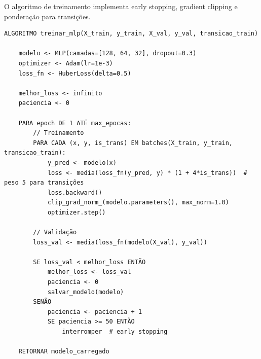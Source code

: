 O algoritmo de treinamento implementa early stopping, gradient clipping e ponderação para transições.

\begin{Verbatim}[breaklines=true, frame=single]
ALGORITMO treinar_mlp(X_train, y_train, X_val, y_val, transicao_train)
    
    modelo <- MLP(camadas=[128, 64, 32], dropout=0.3)
    optimizer <- Adam(lr=1e-3)
    loss_fn <- HuberLoss(delta=0.5)
    
    melhor_loss <- infinito
    paciencia <- 0
    
    PARA epoch DE 1 ATÉ max_epocas:
        // Treinamento
        PARA CADA (x, y, is_trans) EM batches(X_train, y_train, transicao_train):
            y_pred <- modelo(x)
            loss <- media(loss_fn(y_pred, y) * (1 + 4*is_trans))  # peso 5 para transições
            loss.backward()
            clip_grad_norm_(modelo.parameters(), max_norm=1.0)
            optimizer.step()
        
        // Validação
        loss_val <- media(loss_fn(modelo(X_val), y_val))
        
        SE loss_val < melhor_loss ENTÃO
            melhor_loss <- loss_val
            paciencia <- 0
            salvar_modelo(modelo)
        SENÃO
            paciencia <- paciencia + 1
            SE paciencia >= 50 ENTÃO
                interromper  # early stopping
    
    RETORNAR modelo_carregado
\end{Verbatim}
